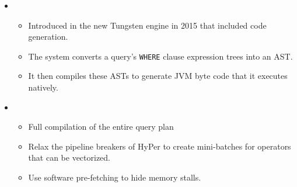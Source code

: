 \documentclass[11pt]{article}
\begin{document}
\begin{itemize}
    \item {}~\cite{armbrust15}
    \begin{itemize}
        \item
        Introduced in the new Tungsten engine in 2015 that included code generation.
        
        \item
        The system converts a query's \texttt{WHERE} clause expression trees into an AST.
        
        \item
        It then compiles these ASTs to generate JVM byte code that it executes natively.
    \end{itemize}
    
    \item {}~\cite{menon17}
    \begin{itemize}
        \item
        Full compilation of the entire query plan
        
        \item
        Relax the pipeline breakers of HyPer to create mini-batches for operators that can be 
        vectorized.
        
        \item
        Use software pre-fetching to hide memory stalls.
    \end{itemize}
\end{itemize}


\newpage


\end{document}
